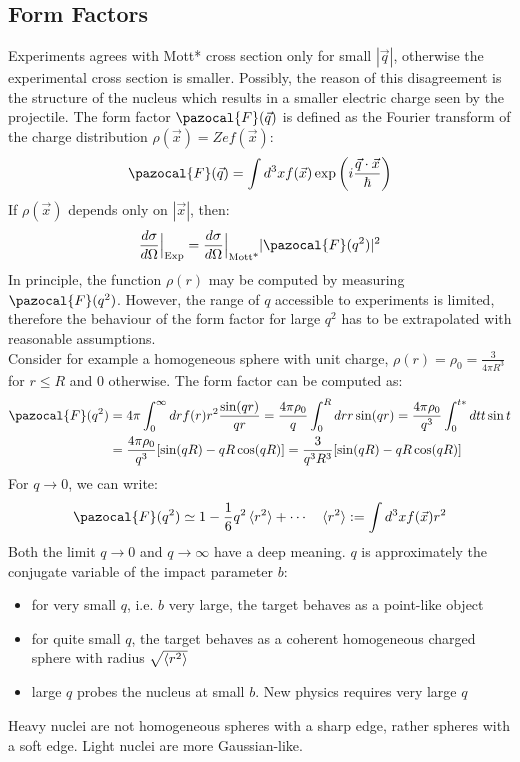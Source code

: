 \documentclass[10.75pt,a4paper,openright,bottom=2cm]{article}
\begin{document}
\subsection{Form Factors}
Experiments agrees with Mott* cross section only for small $|\Vec{q}|$, otherwise the experimental cross section is smaller. Possibly, the reason of this disagreement is the structure of the nucleus which results in a smaller electric charge seen by the projectile. The form factor $\pazocal{F}(\Vec{q})$ is defined as the Fourier transform of the charge distribution $\rho(\Vec{x})=Zef(\Vec{x})$:
\[
\pazocal{F}(\Vec{q})=\int d^3xf(\Vec{x})\exp\left(i\frac{\Vec{q}\cdot\Vec{x}}{\hbar}\right)
\]
If $\rho(\Vec{x})$ depends only on $|\Vec{x}|$, then:
\[
\frac{d\sigma}{d\Omega}\Bigr|_{\substack{\text{Exp}}}=\frac{d\sigma}{d\Omega}\Bigr|_{\substack{\text{Mott*}}}|\pazocal{F}(q^2)|^2
\]
In principle, the function $\rho(r)$ may be computed by measuring $\pazocal{F}(q^2)$. However, the range of $q$ accessible to experiments is limited, therefore the behaviour of the form factor for large $q^2$ has to be extrapolated with reasonable assumptions.\\
Consider for example a homogeneous sphere with unit charge, $\rho(r)=\rho_0=\frac{3}{4\pi R^3}$ for $r\le R$ and 0 otherwise. The form factor can be computed as:
\begin{align*}
\pazocal{F}(q^2)&=4\pi\int_0^\infty drf(r)r^2\frac{\sin(qr)}{qr}=\frac{4\pi\rho_0}{q}\int_0^Rdrr\sin(qr)=\frac{4\pi\rho_0}{q^3}\int_0^{t*}dtt\sin t\\
&=\frac{4\pi\rho_0}{q^3}[\sin(qR)-qR\cos(qR)]=\frac{3}{q^3R^3}[\sin(qR)-qR\cos(qR)]
\end{align*}
For $q\to0$, we can write:
\[
\pazocal{F}(q^2)\simeq1-\frac{1}{6}q^2\braket{r^2}+\cdots \quad \braket{r^2}:=\int d^3xf(\Vec{x})r^2
\]
Both the limit $q\to0$ and $q\to\infty$ have a deep meaning. $q$ is approximately the conjugate variable of the impact parameter $b$:
\begin{itemize}
    \item for very small $q$, i.e. $b$ very large, the target behaves as a point-like object
    \item for quite small $q$, the target behaves as a coherent homogeneous charged sphere with radius $\sqrt{\braket{r^2}}$
    \item large $q$ probes the nucleus at small $b$. New physics requires very large $q$
\end{itemize}
Heavy nuclei are not homogeneous spheres with a sharp edge, rather spheres with a soft edge. Light nuclei are more Gaussian-like.
\end{document}
